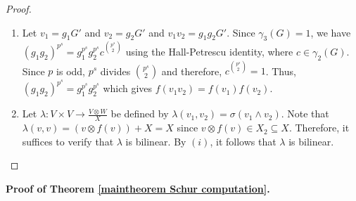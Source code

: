 \documentclass[preprint,sort&compress,12pt]{elsarticle}
\numberwithin{equation}{section}
\theoremstyle{definition}
\begin{document}
 
 
 \begin{proof}
     \begin{enumerate}
         \item[(i)] Let $v_1=g_1G'$ and $v_2=g_2G'$ and $v_1 v_2=g_1g_2G'$. Since ${\gamma_3(G)=1}$, we have $(g_1g_2)^{p^s}=g_1^{p^s}g_2^{p^s}c^{\binom{p^s}{2}}$ using the Hall-Petrescu identity, where $c \in \gamma_2(G)$. Since $p$ is odd, $p^s$ divides $\binom{p^s}{2}$ and therefore, $c^{\binom{p^s}{2}}=1$. Thus, $(g_1g_2)^{p^s}=g_1^{p^s}g_2^{p^s}$ which gives $f(v_1v_2)=f(v_1)f(v_2)$.
         \item[(ii)] Let $\lambda: V \times V \to \frac{V \otimes W}{X}$ be defined by $\lambda(v_1,v_2)=\sigma(v_1 \wedge v_2)$. Note that $\lambda(v,v)=(v \otimes f(v))+X=X$ since $v \otimes f(v) \in X_2 \subseteq X$. Therefore, it suffices to verify that $\lambda$ is bilinear. By $(i)$, it follows that $\lambda$ is bilinear.
     \end{enumerate}
 \end{proof}
\textbf{Proof of Theorem \ref{maintheorem Schur computation}.}
\end{document}
